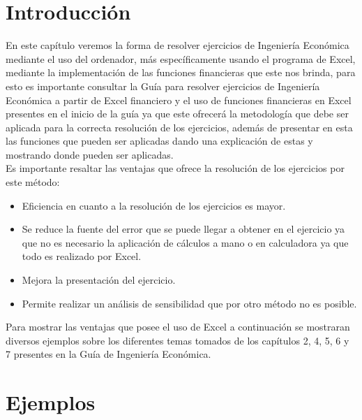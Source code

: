 \clearpage

\section{Introducción}

En este capítulo veremos la forma de resolver ejercicios de Ingeniería Económica mediante el uso del ordenador, más específicamente usando el programa de Excel, mediante la implementación de las funciones financieras que este nos brinda, para esto es importante consultar la Guía para resolver ejercicios de Ingeniería Económica a partir de Excel financiero y el uso de funciones financieras en Excel presentes en el inicio de la guía ya que este ofrecerá la metodología que debe ser aplicada para la correcta resolución de los ejercicios, además de presentar en esta las funciones que pueden ser aplicadas dando una explicación de estas y mostrando donde pueden ser aplicadas.
\\

Es importante resaltar las ventajas que ofrece la resolución de los ejercicios por este método: \\

\begin{itemize}
 \item Eficiencia en cuanto a la resolución de los ejercicios es mayor.\\
 \item Se reduce la fuente del error que se puede llegar a obtener en el ejercicio ya que no es necesario la aplicación de cálculos a mano o en calculadora ya que todo es realizado por Excel.\\
 \item Mejora la presentación del ejercicio.\\
 \item Permite realizar un análisis de sensibilidad que por otro método no es posible.\\

\end{itemize}

Para mostrar las ventajas que posee el uso de Excel a continuación se mostraran diversos ejemplos sobre los diferentes temas tomados de los capítulos 2, 4, 5, 6 y 7 presentes en la Guía de Ingeniería Económica.

\section{Ejemplos}

